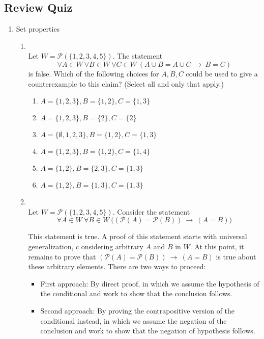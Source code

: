 \documentclass[12pt, oneside]{article}
\begin{document}
\subsection*{Review Quiz}
\begin{enumerate}
\item Set properties
\begin{enumerate}
    \item \hspace{1in}\\ 

Let $W =  \mathcal{P}(\{1,2,3,4,5\})$.
The statement $$\forall A \in W~ \forall B\in W~ \forall  C  \in W~  ( A \cup B =  A \cup C ~\to~  B = C) $$ is false.
Which of the following  choices for  $A, B, C$ could  
be used to  give a counterexample to this claim?
(Select all and only that  apply.)
\begin{enumerate}
    \item $A = \{ 1, 2, 3 \}, B = \{ 1, 2\}, C= \{1, 3\}$
    \item $A = \{ 1, 2, 3 \}, B = \{ 2\}, C= \{2\}$
    \item $A = \{ \emptyset, 1, 2, 3 \}, B = \{ 1, 2\}, C= \{1, 3\}$
    \item $A = \{ 1, 2, 3 \}, B = \{ 1, 2\}, C= \{1, 4\}$
    \item $A = \{ 1, 2 \}, B = \{ 2, 3\}, C= \{1, 3\}$
    \item $A = \{ 1,2 \}, B =  \{ 1,3\}, C =  \{ 1,3\}$
\end{enumerate}     \item \hspace{1in}\\ 

Let $W =  \mathcal{P}(\{1,2,3,4,5\})$.
Consider the  statement
$$\forall A \in W~ \forall B\in W~  \big( ( \mathcal{P}(A) = \mathcal{P}(B) )~\to~ (A = B) \big) $$

This statement is true. A proof of this statement starts with universal generalization, c
onsidering
arbitrary $A$ and $B$ in $W$. At this point, it remains to prove that 
$( \mathcal{P}(A) = \mathcal{P}(B) )~\to~ (A = B)$
is true about these arbitrary elements.  There are two ways to proceed: 

\begin{itemize}
\item[] First approach: By direct proof, in which we assume the hypothesis of the 
conditional and work to show that the conclusion follows.
\item[] Second approach: By proving the contrapositive version of the conditional instead, in which we
assume the negation of the conclusion and work to show that the negation of hypothesis follows.
\end{itemize} 


\end{enumerate}
\end{enumerate}
\end{document}
